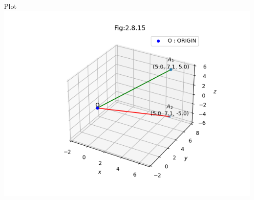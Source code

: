 \documentclass{beamer}
\begin{document}
\begin{frame}{Plot}
    \centering
    \includegraphics[width=\columnwidth, height=0.8\textheight, keepaspectratio]{figs/vector1.png}   
\end{frame}
\end{document}
